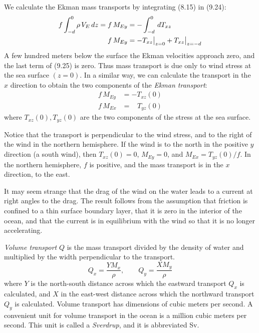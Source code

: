 We calculate the Ekman mass transports by integrating (8.15) in (9.24):
\begin{align}
f\int_{-d}^0\rho\,V_E\,dz =f\,M_{Ey} &=-\int_{-d}^0 \,d T_{xz}   \notag \\
f\,M_{Ey} &=-T_{xz}\big|_{z=0} + T_{xz}\big|_{z=-d}
\end{align}
A few hundred meters below the surface the Ekman velocities approach zero, and the
last term of (9.25) is zero. Thus mass transport is due only to
wind stress at the sea surface $(z = 0)$. In a
similar way, we can calculate the transport in the $x$ direction to obtain the two components
of the
\textit{Ekman transport}:
\begin{subequations}
\begin{align}
f\,M_{Ey} &= -T_{xz}(0) \\
f\,M_{Ex} &= \;\;\; T_{yz}(0)
\end{align}
\end{subequations}
where $T_{xz}(0), T_{yz}(0)$ are the two components of the stress at the sea
surface.

Notice that the transport is perpendicular to the wind stress, and to the right of the wind in the northern hemisphere. If the wind is to
the north in the positive $y$ direction (a south wind), then $T_{xz}(0) = 0$, $M_{Ey} =
0$, and $M_{Ex} = T_{yz}(0)/f$. In the northern hemisphere, $f$ is positive,
and the mass transport is in the $x$ direction, to the east.

It may seem strange that the drag of the wind on the water leads to a current at
right angles to the drag. The result follows from the assumption that friction is
confined to a thin surface boundary layer, that it is zero in the interior of the
ocean, and that the current is in equilibrium with the wind so that it is no
longer accelerating.

\textit{Volume transport} $Q$ is the mass transport divided by the density
of water and multiplied by the width perpendicular to the transport.
\begin{equation}
Q_x=\frac{Y M_x}{\rho}, \qquad Q_y=\frac{X M_y}{\rho}
\end{equation}
where $Y$ is the north-south distance across which the eastward
transport $Q_x$ is calculated, and $X$ in the east-west distance
across which the northward transport $Q_y$ is calculated. Volume transport has dimensions of
cubic meters per second. A convenient unit for volume transport in the ocean is a million cubic
meters per second. This unit is called a \textit{Sverdrup}, and it is
abbreviated Sv.

